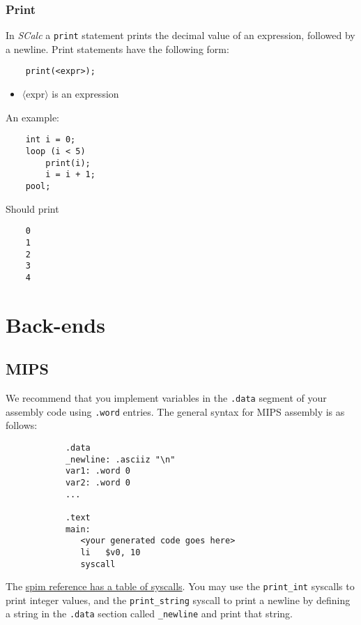 \documentclass{article}
\newcommand{\code}[1]{\texttt{\textmd{#1}}}
\begin{document}
\subsubsection{Print}
\label{sssec:print}

In \textit{SCalc} a \texttt{print} statement prints the decimal value of an expression, followed by a newline.
Print statements have the following form:

\begin{lstlisting}
	print(<expr>);
\end{lstlisting}

\begin{itemize}
	\item{$\langle$expr$\rangle$} is an expression
\end{itemize}

An example:

\begin{lstlisting}
	int i = 0;
	loop (i < 5)
		print(i);
		i = i + 1;
	pool;
\end{lstlisting}

Should print

\begin{lstlisting}
	0
	1
	2
	3
	4
\end{lstlisting}

\section{Back-ends}

	\subsection{MIPS}

		We recommend that you implement variables in the \code{.data} segment of your assembly code using \code{.word} entries. The
		general syntax for MIPS assembly is as follows:

		\begin{lstlisting}
			.data
			_newline: .asciiz "\n"
			var1: .word 0
			var2: .word 0
			...

			.text
			main:
			   <your generated code goes here>
			   li   $v0, 10
			   syscall
		\end{lstlisting}

		The \href{https://www.cs.tcd.ie/\string~waldroj/itral/spim_ref.html}{spim reference has a table of syscalls}.
		You may use the \texttt{print\_int} syscalls to print integer values, and the \texttt{print\_string} syscall to
		print a newline by defining a string in the \texttt{.data} section called \texttt{\_newline} and print that
		string.
\end{document}
